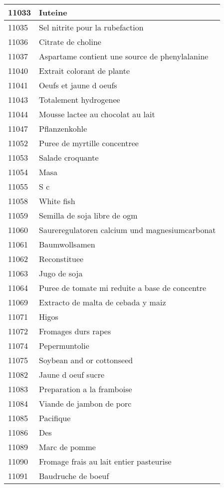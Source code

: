 \begin{longtable}{|l|l|}
11033 & Iuteine \\ \hline 
11035 & Sel nitrite pour la rubefaction \\ \hline 
11036 & Citrate de choline \\ \hline 
11037 & Aspartame contient une source de phenylalanine \\ \hline 
11040 & Extrait colorant de plante \\ \hline 
11041 & Oeufs et jaune d oeufs \\ \hline 
11043 & Totalement hydrogenee \\ \hline 
11044 & Mousse lactee au chocolat au lait \\ \hline 
11047 & Pflanzenkohle \\ \hline 
11052 & Puree de myrtille concentree \\ \hline 
11053 & Salade croquante \\ \hline 
11054 & Masa \\ \hline 
11055 & S c \\ \hline 
11058 & White fish \\ \hline 
11059 & Semilla de soja libre de ogm \\ \hline 
11060 & Saureregulatoren calcium und magnesiumcarbonat \\ \hline 
11061 & Baumwollsamen \\ \hline 
11062 & Reconstituee \\ \hline 
11063 & Jugo de soja \\ \hline 
11064 & Puree de tomate mi reduite a base de concentre \\ \hline 
11069 & Extracto de malta de cebada y maiz \\ \hline 
11071 & Higos \\ \hline 
11072 & Fromages durs rapes \\ \hline 
11074 & Pepermuntolie \\ \hline 
11075 & Soybean and or cottonseed \\ \hline 
11082 & Jaune d oeuf sucre \\ \hline 
11083 & Preparation a la framboise \\ \hline 
11084 & Viande de jambon de porc \\ \hline 
11085 & Pacifique \\ \hline 
11086 & Des \\ \hline 
11089 & Marc de pomme \\ \hline 
11090 & Fromage frais au lait entier pasteurise \\ \hline 
11091 & Baudruche de boeuf \\ \hline 

\end{longtable}
